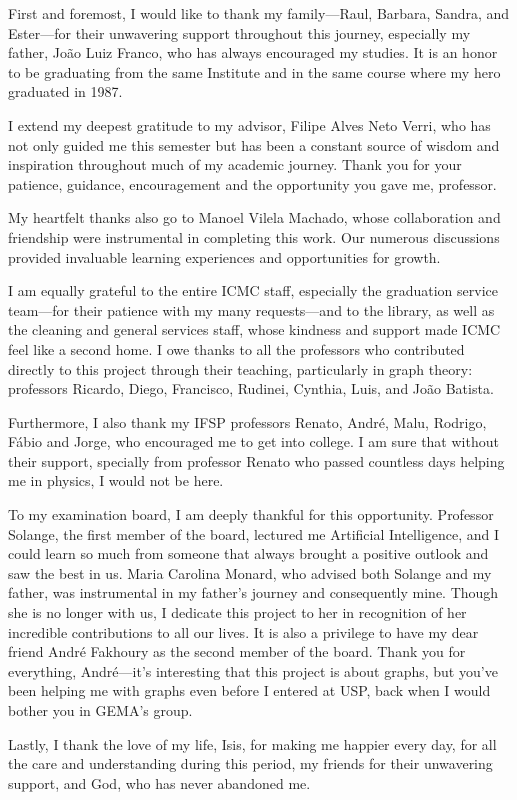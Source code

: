\begin{agradecimentos}

    First and foremost, I would like to thank my family—Raul, Barbara, Sandra, and Ester—for their unwavering support throughout this journey, especially my father, João Luiz Franco, who has always encouraged my studies. It is an honor to be graduating from the same Institute and in the same course where my hero graduated in 1987. 

    I extend my deepest gratitude to my advisor, Filipe Alves Neto Verri, who has not only guided me this semester but has been a constant source of wisdom and inspiration throughout much of my academic journey. Thank you for your patience, guidance, encouragement and the opportunity you gave me, professor.

    My heartfelt thanks also go to Manoel Vilela Machado, whose collaboration and friendship were instrumental in completing this work. Our numerous discussions provided invaluable learning experiences and opportunities for growth.

    I am equally grateful to the entire ICMC staff, especially the graduation service team—for their patience with my many requests—and to the library, as well as the cleaning and general services staff, whose kindness and support made ICMC feel like a second home. I owe thanks to all the professors who contributed directly to this project through their teaching, particularly in graph theory: professors Ricardo, Diego, Francisco, Rudinei, Cynthia, Luis, and João Batista. 
    
    Furthermore, I also thank my IFSP professors Renato, André, Malu, Rodrigo, Fábio and Jorge, who encouraged me to get into college. I am sure that without their support, specially from professor Renato who passed countless days helping me in physics, I would not be here. 

    To my examination board, I am deeply thankful for this opportunity. Professor Solange, the first member of the board, lectured me Artificial Intelligence, and I could learn so much from someone that always brought a positive outlook and saw the best in us. Maria Carolina Monard, who advised both Solange and my father, was instrumental in my father's journey and consequently mine. Though she is no longer with us, I dedicate this project to her in recognition of her incredible contributions to all our lives. It is also a privilege to have my dear friend André Fakhoury as the second member of the board. Thank you for everything, André—it's interesting that this project is about graphs, but you've been helping me with graphs even before I entered at USP, back when I would bother you in GEMA's group.

    Lastly, I thank the love of my life, Isis, for making me happier every day, for all the care and understanding during this period, my friends for their unwavering support, and God, who has never abandoned me.

\end{agradecimentos}
